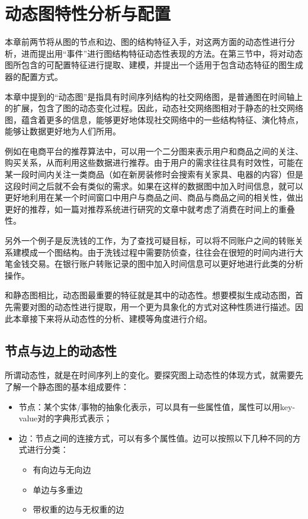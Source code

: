 
\chapter{动态图特性分析与配置}
\label{cha:chapter02}

本章前两节将从图的节点和边、图的结构特征入手，对这两方面的动态性进行分析，进而提出用“事件”进行图结构特征动态性表现的方法。在第三节中，将对动态图所包含的可配置特征进行提取、建模，并提出一个适用于包含动态特征的图生成器的配置方式。

本章中提到的“动态图”是指具有时间序列结构的社交网络图，是普通图在时间轴上的扩展，包含了图的动态变化过程。因此，动态社交网络图相对于静态的社交网络图，蕴含着更多的信息，能够更好地体现社交网络中的一些结构特征、演化特点，能够让数据更好地为人们所用。

例如在电商平台的推荐算法中，可以用一个二分图来表示用户和商品之间的关注、购买关系，从而利用这些数据进行推荐\cite{7009419}。由于用户的需求往往具有时效性，可能在某一段时间内关注一类商品（如在新房装修时会搜索有关家具、电器的内容）但是这段时间之后就不会有类似的需求。如果在这样的数据图中加入时间信息，就可以更好地利用在某一个时间窗口中用户与商品之间、商品与商品之间的相关性，做出更好的推荐，如一篇对推荐系统进行研究的文章\cite{NAJAFABADI2019526}中就考虑了消费在时间上的重叠性。

另外一个例子是反洗钱的工作，为了查找可疑目标，可以将不同账户之间的转账关系建模成一个图结构。由于洗钱过程中需要防侦查，往往会在很短的时间内进行大笔金钱交易。在银行账户转账记录的图中加入时间信息可以更好地进行此类的分析操作\cite{pareja2019evolvegcn}。

和静态图相比，动态图最重要的特征就是其中的动态性。想要模拟生成动态图，首先需要对图的动态性进行提取，用一个更为具象化的方式对这种性质进行描述。因此本章接下来将从动态性的分析、建模等角度进行介绍。

\section{节点与边上的动态性}
\label{cha:node_edge_dynamic}

所谓动态性，就是在时间序列上的变化。要探究图上动态性的体现方式，就需要先了解一个静态图的基本组成要件：

\begin{itemize}
    \item 节点：某个实体/事物的抽象化表示，可以具有一些属性值，属性可以用key-value对的字典形式表示；
    \item 边：节点之间的连接方式，可以有多个属性值。边可以按照以下几种不同的方式进行分类：
    \begin{itemize}
        \item 有向边与无向边
        \item 单边与多重边
        \item 带权重的边与无权重的边
    \end{itemize}
\end{itemize}

